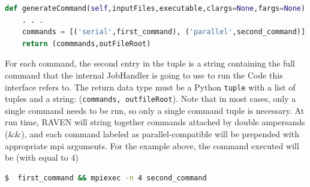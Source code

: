 \begin{lstlisting}[language=python]
  def generateCommand(self,inputFiles,executable,clargs=None,fargs=None):
    . . .
    commands = [('serial',first_command), ('parallel',second_command)]
    return (commmands,outFileRoot)
\end{lstlisting}
For each command, the second entry in the tuple is a string containing the full command
that the internal JobHandler is going to use to run the Code this interface refers to.
The return data type must be a Python \texttt{tuple} with a list of tuples and a string: (\texttt{commands, outfileRoot}).
Note that in most cases, only a single command needs to be run, so only a single command tuple is necessary.
At run time, RAVEN will string together commands attached by double ampersands (\&\&), and each command
labeled as parallel-compatible will be prepended with appropriate mpi arguments.  For the example above, the
command executed will be (with  equal to 4)

\begin{lstlisting}[language=bash]
$  first_command && mpiexec -n 4 second_command
\end{lstlisting}

